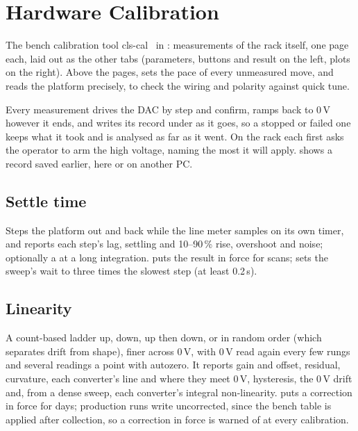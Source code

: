 \section{Hardware Calibration}
\label{sec:hardware}

The bench calibration tool cls-cal~\cite{clscal} in \oracle{}: measurements of the rack
itself, one page each, laid out as the other tabs (parameters, buttons and result on the
left, plots on the right). Above the pages,  sets the pace of
every unmeasured move, and  reads the platform
precisely, to check the wiring and polarity against quick tune.

Every measurement drives the DAC by step and confirm, ramps back to 0\,V however it ends,
and writes its record under  as it goes, so a stopped
or failed one keeps what it took and is analysed as far as it went. On the rack each first
asks the operator to arm the high voltage, naming the most it will apply. 
shows a record saved earlier, here or on another PC.

\subsection{Settle time}

Steps the platform out and back while the line meter samples on its own timer, and reports
each step's lag, settling and 10--90\,\% rise, overshoot and noise; optionally a  at a long integration.  puts the result in force for
scans;  sets the sweep's wait to three times the
slowest step (at least 0.2\,s).

\subsection{Linearity}

A count-based ladder up, down, up then down, or in random order (which separates drift from
shape), finer across 0\,V, with 0\,V read again every few rungs and several readings a point
with autozero. It reports gain and offset, residual, curvature, each converter's line and
where they meet 0\,V, hysteresis, the 0\,V drift and, from a dense sweep, each converter's
integral non-linearity.  puts a correction in force for
 days; production runs write uncorrected, since the bench table is applied
after collection, so a correction in force is warned of at every calibration.

